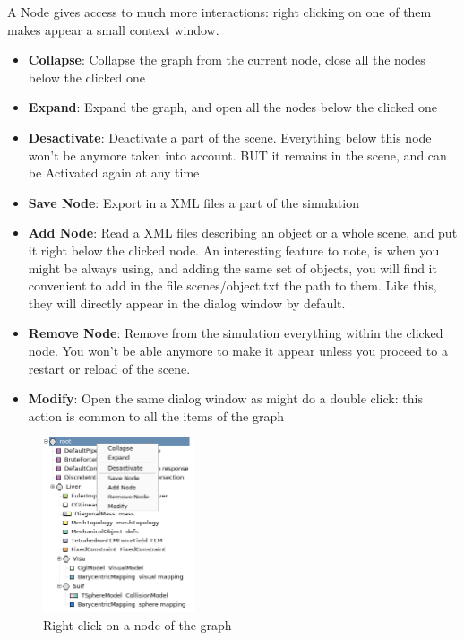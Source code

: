 \par
A Node gives access to much more interactions: right clicking on one of them makes appear a small context window.
\begin{itemize}
 \item {\bf Collapse}: Collapse the graph from the current node, close all the nodes below the clicked one
 \item {\bf Expand}: Expand the graph, and open all the nodes below the clicked one
 \item {\bf Desactivate}: Deactivate a part of the scene. Everything below this node won't be anymore taken into account. BUT it remains in the scene, and can be Activated again at any time
 \item {\bf Save Node}: Export in a XML files a part of the simulation
 \item {\bf Add Node}: Read a XML files describing an object or a whole scene, and put it right below the clicked node.
An interesting feature to note, is when you might be always using, and adding the same set of objects, you will find it convenient to add in the file scenes/object.txt the path to them. Like this, they will directly appear in the dialog window by default.
 \item {\bf Remove Node}: Remove from the simulation everything within the clicked node. You won't be able anymore to make it appear unless you proceed to a restart or reload of the scene.
 \item {\bf Modify}: Open the same dialog window as might do a double click: this action is common to all the items of the graph
\end{itemize}

\begin{figure}[htpb]
	\centering
		\includegraphics[width=0.4\textwidth]{GUI/GUI_interaction.png}
	\caption{Right click on a node of the graph}
\end{figure}









